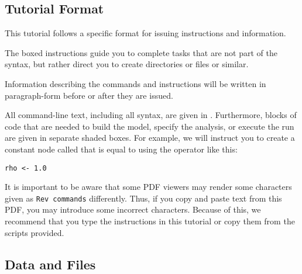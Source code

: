 
\medskip
\subsection{Tutorial Format}\label{subsect:Exercise-Format}

This tutorial follows a specific format for issuing instructions and information.

{\begin{framed}
The boxed instructions guide you to complete tasks that are not part of the \RevBayes syntax, but rather direct you to create directories or files or similar.
\end{framed}}

Information describing the commands and instructions will be written in paragraph-form before or after they are issued.

All command-line text, including all \Rev syntax, are given in . 
Furthermore, blocks of \Rev code that are needed to build the model, specify the analysis, or execute the run are given in separate shaded boxes.
For example, we will instruct you to create a constant node called  that is equal to  using the \cl{<-} operator like this:
{\tt \begin{snugshade*}
\begin{lstlisting}
rho <- 1.0
\end{lstlisting}
\end{snugshade*}}

It is important to be aware that some PDF viewers may render some characters given as \colorbox{shadecolor}{\tt{Rev commands}} differently. 
Thus, if you copy and paste text from this PDF, you may introduce some incorrect characters. 
Because of this, we recommend that you type the instructions in this tutorial or copy them from the scripts provided. 


\medskip
\subsection{Data and Files}\label{subsect:Exercise-DataFiles}

